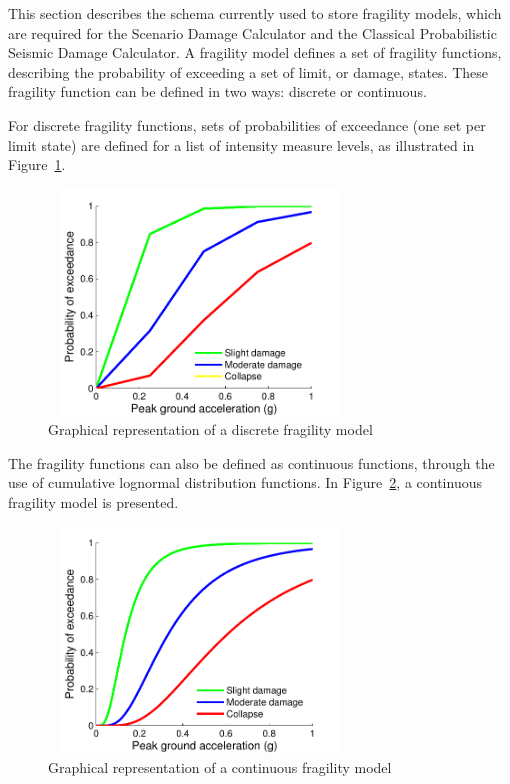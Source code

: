 This section describes the schema currently used to store \glspl{fragility
model}, which are required for the Scenario Damage Calculator and the
Classical Probabilistic Seismic Damage Calculator. A \gls{fragility model}
defines a set of \glspl{fragility function}, describing the probability of
exceeding a set of limit, or damage, states. These \gls{fragility function}
can be defined in two ways: discrete or continuous.

For discrete fragility functions, sets of probabilities of exceedance (one set
per limit state) are defined for a list of intensity measure levels, as
illustrated in Figure~\ref{fig:fragModelDiscrete}.

\begin{figure}[ht]
\centering
\includegraphics[width=8cm,height=6cm]{figures/risk/DisFragilityModel.pdf}
\caption{Graphical representation of a discrete fragility model}
\label{fig:fragModelDiscrete}
\end{figure}

The \glspl{fragility function} can also be defined as continuous functions,
through the use of cumulative lognormal distribution functions. In
Figure~\ref{fig:fragModelContinuous}, a continuous fragility model is
presented.

\begin{figure}[ht]
\centering
\includegraphics[width=8cm,height=6cm]{figures/risk/ConFragilityModel.pdf}
\caption{Graphical representation of a continuous fragility model}
\label{fig:fragModelContinuous}
\end{figure}

